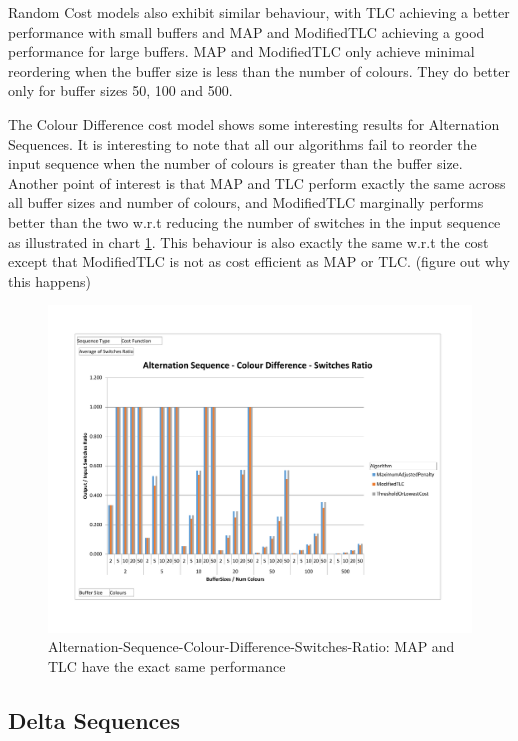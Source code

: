 Random Cost models also exhibit similar behaviour, with TLC achieving a better performance with small buffers and MAP and ModifiedTLC achieving a good performance for large buffers. MAP and ModifiedTLC only achieve minimal reordering when the buffer size is less than the number of colours. They do better only for buffer sizes 50, 100 and 500. 

The Colour Difference cost model shows some interesting results for Alternation Sequences. It is interesting to note that all our algorithms fail to reorder the input sequence when the number of colours is greater than the buffer size. Another point of interest is that MAP and TLC perform exactly the same across all buffer sizes and number of colours, and ModifiedTLC marginally performs better than the two w.r.t reducing the number of switches in the input sequence as illustrated in chart \ref{AlternationSeqColourDifferenceSwitches}. This behaviour is also exactly the same w.r.t the cost except that ModifiedTLC is not as cost efficient as MAP or TLC. (figure out why this happens)

\begin{figure}[ht]
\centering 
\includegraphics[scale=0.60]{Alternation-Seq-Colour-Difference-Switches.pdf}
\caption{Alternation-Sequence-Colour-Difference-Switches-Ratio: MAP and TLC have the exact same performance}
\label{AlternationSeqColourDifferenceSwitches}
\end{figure}

\subsection{Delta Sequences}


